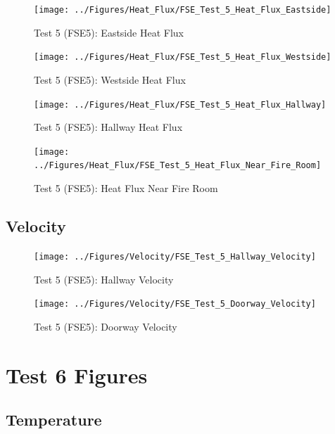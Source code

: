 \documentclass[12pt,oneside]{book}
\begin{document}
\begin{figure}[!ht]
	\texttt{[image: ../Figures/Heat\_Flux/FSE\_Test\_5\_Heat\_Flux\_Eastside]}
	\caption{Test 5 (FSE5): Eastside Heat Flux}
	\label{fig:Test_5_Eastside_Heat_Flux}
\end{figure}

\begin{figure}[!ht]
	\texttt{[image: ../Figures/Heat\_Flux/FSE\_Test\_5\_Heat\_Flux\_Westside]}
	\caption{Test 5 (FSE5): Westside Heat Flux}
	\label{fig:Test_5_Westside_Heat_Flux}
\end{figure}

\begin{figure}[!ht]
	\texttt{[image: ../Figures/Heat\_Flux/FSE\_Test\_5\_Heat\_Flux\_Hallway]}
	\caption{Test 5 (FSE5): Hallway Heat Flux}
	\label{fig:Test_5_Hallway_Heat_Flux}
\end{figure}

\begin{figure}[!ht]
	\texttt{[image: ../Figures/Heat\_Flux/FSE\_Test\_5\_Heat\_Flux\_Near\_Fire\_Room]}
	\caption{Test 5 (FSE5): Heat Flux Near Fire Room}
	\label{fig:Test_5_Heat_Flux_Near_Fire_Room}
\end{figure}

\subsection{Velocity}
\label{subsec:Velocity}

\begin{figure}[!ht]
	\texttt{[image: ../Figures/Velocity/FSE\_Test\_5\_Hallway\_Velocity]}
	\caption{Test 5 (FSE5): Hallway Velocity}
	\label{fig:Test_5_Hallway_Velocity}
\end{figure}

\begin{figure}[!ht]
	\texttt{[image: ../Figures/Velocity/FSE\_Test\_5\_Doorway\_Velocity]}
	\caption{Test 5 (FSE5): Doorway Velocity}
	\label{fig:Test_5_Doorway_Velocity}
\end{figure}

\clearpage

\section{Test 6 Figures}
\label{subsec:Test_6_Figures}

\subsection{Temperature}
\label{subsec:Temperature}
\end{document}
